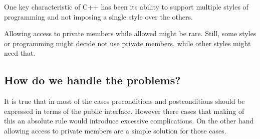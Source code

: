 One key characteristic of C++ has been its ability to support multiple styles of
programming and not imposing a single style over the others.

Allowing access to private members while allowed might be rare. Still, some
styles or programming might decide not use private members, while other styles
might need that.

\subsection{How do we handle the problems?}

It is true that in most of the cases preconditions and postconditions should be
expressed in terms of the public interface. However there cases that making of
this an absolute rule would introduce excessive complications. On the other hand
allowing access to private members are a simple solution for those cases.


